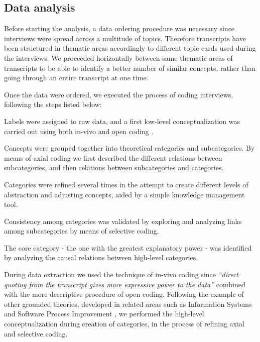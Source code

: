 \documentclass[10pt,journal,letterpaper,compsoc]{IEEEtran}
\begin{document}
\subsection{Data analysis} Before starting the analysis, a data ordering
procedure was necessary since  interviews were spread across a multitude of
topics. Therefore transcripts have  been structured in thematic areas
accordingly to different topic cards used  during the interviews. We proceeded
horizontally between same thematic areas of  transcripts to be able to identify
a better number of similar concepts, rather  than going through an entire
transcript at one time.

Once the data were ordered, we executed the process of coding interviews,
following the steps listed below:


\begin{compactitem}

\item Labels were assigned to raw data, and a first low-level conceptualization
was carried out using both in-vivo and open coding \cite{ColinRobson2009}. 
\item Concepts were grouped together into theoretical categories and  
subcategories. By means of axial coding we first described the different  
relations between subcategories, and then relations between subcategories and  
categories. 
\item Categories were refined several times in the attempt to create different  
levels of abstraction and adjusting concepts, aided by a simple knowledge  
management tool. 
\item Consistency among categories was validated by exploring and
analyzing  links among subcategories by means of selective coding. 
\item The core category - the one with the greatest explanatory power - was  
identified by analyzing the causal relations between high-level categories. 
\end{compactitem}


During data extraction we used the technique of in-vivo coding since
\textit{``direct quoting from the transcript gives more expressive power to the
data''} \cite{ColinRobson2009} combined with the more descriptive procedure of
open coding. Following the example of other grounded theories, developed in
related areas such as Information Systems \cite{Orlikowski1993} and Software
Process Improvement \cite{Coleman2006}, we performed the high-level
conceptualization during creation of categories, in the process of refining
axial and selective coding.
\end{document}
